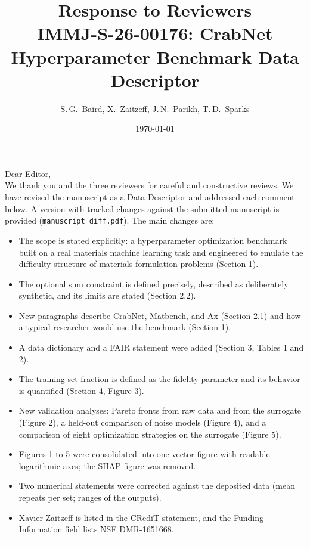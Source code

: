 \documentclass[11pt]{article}
\title{Response to Reviewers\\[-0.2em]
  \large IMMJ-S-26-00176: CrabNet Hyperparameter Benchmark Data Descriptor}
\author{S.\,G.~Baird, X.~Zaitzeff, J.\,N.~Parikh, T.\,D.~Sparks}
\date{\today}
\newcommand{\reviewer}[1]{\bigskip\noindent{\large\bfseries #1}\par
  \rule{\linewidth}{0.8pt}\par}
\begin{document}
\maketitle

\noindent Dear Editor,\\[0.5em]
We thank you and the three reviewers for careful and constructive reviews. We have revised the manuscript as a Data Descriptor and addressed each comment below. A version with tracked changes against the submitted manuscript is provided (\texttt{manuscript\_diff.pdf}). The main changes are:
\begin{itemize}[nosep]
  \item The scope is stated explicitly: a hyperparameter optimization benchmark built on a real materials machine learning task and engineered to emulate the difficulty structure of materials formulation problems (Section 1).
  \item The optional sum constraint is defined precisely, described as deliberately synthetic, and its limits are stated (Section 2.2).
  \item New paragraphs describe CrabNet, Matbench, and Ax (Section 2.1) and how a typical researcher would use the benchmark (Section 1).
  \item A data dictionary and a FAIR statement were added (Section 3, Tables 1 and 2).
  \item The training-set fraction is defined as the fidelity parameter and its behavior is quantified (Section 4, Figure 3).
  \item New validation analyses: Pareto fronts from raw data and from the surrogate (Figure 2), a held-out comparison of noise models (Figure 4), and a comparison of eight optimization strategies on the surrogate (Figure 5).
  \item Figures 1 to 5 were consolidated into one vector figure with readable logarithmic axes; the SHAP figure was removed.
  \item Two numerical statements were corrected against the deposited data (mean repeats per set; ranges of the outputs).
  \item Xavier Zaitzeff is listed in the CRediT statement, and the Funding Information field lists NSF DMR-1651668.
\end{itemize}

\reviewer{Editor}
\end{document}
